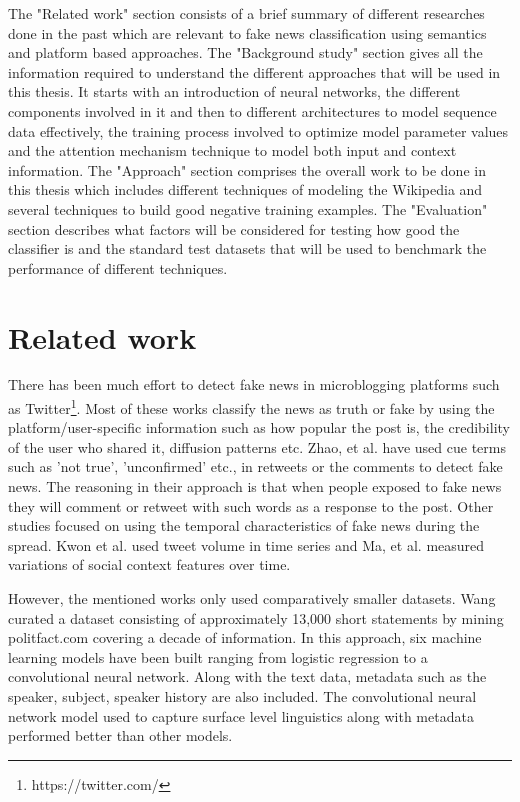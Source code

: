 \documentclass[a4paper, 11pt]{article}
\begin{document}
The "Related work" section consists of a brief summary of different researches done in the past which are relevant to fake news classification using semantics and platform based approaches. The "Background study" section gives all the information required to understand the different approaches that will be used in this thesis. It starts with an introduction of neural networks, the different components involved in it and then to different architectures to model sequence data effectively, the training process involved to optimize model parameter values and the attention mechanism technique to model both input and context information. The "Approach" section comprises the overall work to be done in this thesis which includes different techniques of modeling the Wikipedia and several techniques to build good negative training examples. The "Evaluation" section describes what factors will be considered for testing how good the classifier is and the standard test datasets that will be used to benchmark the performance of different techniques. 
\section{Related work}


There has been much effort to detect fake news in microblogging platforms such as Twitter\footnote{https://twitter.com/}. Most of these works \cite{Liu2015} \cite{Ma2015}classify the news as truth or fake by using the platform/user-specific information such as how popular the post is, the credibility of the user who shared it, diffusion patterns etc. Zhao, et al. \cite{Zhao2015} have used cue terms such as 'not true', 'unconfirmed' etc., in retweets or the comments to detect fake news. The reasoning in their approach is that when people exposed to fake news they will comment or retweet with such words as a response to the post. Other studies focused on using the temporal characteristics of fake news during the spread. Kwon et al.\cite{Kwon2013} used tweet volume in time series and Ma, et al.\cite{Ma2015} measured variations of social context features over time. 

However, the mentioned works only used comparatively smaller datasets. Wang \cite{Wang2017} curated a dataset consisting of approximately 13,000 short statements by mining politfact.com covering a decade of information. In this approach, six machine learning models have been built ranging from logistic regression to a convolutional neural network. Along with the text data, metadata such as the speaker, subject, speaker history are also included. The convolutional neural network model used to capture surface level linguistics along with metadata performed better than other models.
\end{document}
